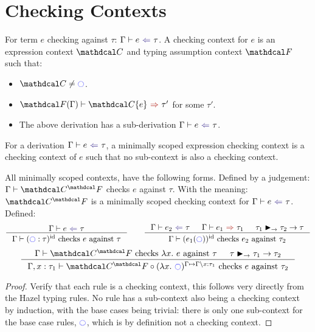 \section{Checking Contexts}
\label{sec:CheckingContexts}
\begin{definition}
\label{def:CheckingContextAppendix}
For term $e$ checking against $\tau$: $\analysis[\Gamma]{e}{\tau}$. A checking context for $e$ is an expression context $\C$ and typing assumption context $\F$ such that: 
\begin{itemize}
\item $\C \neq \cmark$.
\item $\synthesis[\F(\Gamma)]{\C\{e\}}{\tau'}$ for some $\tau'$.
\item The above derivation has a sub-derivation $\analysis[\Gamma]{e}{\tau}$.
\end{itemize}
\end{definition}
\begin{definition}
For a derivation $\analysis[\Gamma]{e}{\tau}$, a minimally scoped expression checking context is a checking context of $e$ such that no sub-context is also a checking context.
\end{definition}

\begin{proposition}
All minimally scoped contexts, have the following forms. Defined by a judgement: $\Gamma \vdash \C^\F$ checks $e$ against $\tau$. With the meaning: $\C^\F$ is a minimally scoped checking context for $\analysis{e}{\tau}$. Defined:
\[\inference{\analysis{e}{\tau}}{\Gamma \vdash (\cmark : \tau)^{\mathrm{id}} \text{ checks } e \text{ against } \tau} \qquad \inference{\analysis{e_2}{\tau} & \synthesis{e_1}{\tau_1} & \tau_1 \funmatch \tau_2 \to \tau}{\Gamma \vdash (e_1(\cmark))^{\mathrm{id}} \text{ checks } e_2 \text{ against } \tau_2}\]
\[\inference{\Gamma \vdash \C^\F \text{ checks } \lambda x.\ e \text{ against } \tau & \tau \funmatch \tau_1 \to \tau_2}{\Gamma, x:\tau_1 \vdash \C^\F \circ (\lambda x.\ \cmark)^{\Gamma \mapsto \Gamma\backslash x:\tau_1} \text{ checks } e \text{ against } \tau_2}\]
\end{proposition}
\begin{proof}
Verify that each rule is a checking context, this follows very directly from the Hazel typing rules. No rule has a sub-context also being a checking context by induction, with the base cases being trivial: there is only one sub-context for the base case rules, $\cmark$, which is by definition not a checking context.
\end{proof}

